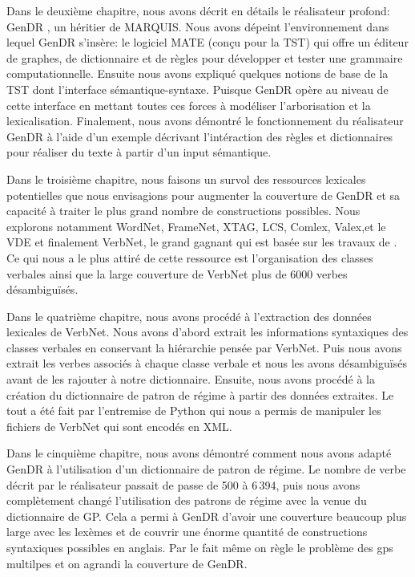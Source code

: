 Dans le deuxième chapitre, nous avons décrit en détails le réalisateur profond: GenDR \citep{lareau18}, un héritier de MARQUIS. Nous avons dépeint l'environnement dans lequel GenDR s'insère: le logiciel MATE (conçu pour la TST) qui offre un éditeur de graphes, de dictionnaire et de règles pour développer et tester une grammaire computationnelle. Ensuite nous avons expliqué quelques notions de base de la \ac{TST} dont l'interface sémantique-syntaxe. Puisque GenDR opère au niveau de cette interface en mettant toutes ces forces à modéliser l'arborisation et la lexicalisation. Finalement, nous avons démontré le fonctionnement du réalisateur GenDR à l'aide d'un exemple décrivant l'intéraction des règles et dictionnaires pour réaliser du texte à partir d'un input sémantique.

Dans le troisième chapitre, nous faisons un survol des ressources lexicales potentielles que nous envisagions pour augmenter la couverture de GenDR et sa capacité à traiter le plus grand nombre de constructions possibles. Nous explorons notamment WordNet, FrameNet, XTAG, LCS, Comlex, Valex,et le VDE et finalement VerbNet, le grand gagnant qui est basée sur les travaux de \cite{verb-classes.levin.1993}. Ce qui nous a le plus attiré de cette ressource est l'organisation des classes verbales ainsi que la large couverture de VerbNet plus de 6000 verbes désambiguïsés.

Dans le quatrième chapitre, nous avons procédé à l'extraction des données lexicales de VerbNet. Nous avons d'abord extrait les informations syntaxiques des classes verbales en conservant la hiérarchie pensée par VerbNet. Puis nous avons extrait les verbes associés à chaque classe verbale et nous les avons désambiguïsés avant de les rajouter à notre dictionnaire. Ensuite, nous avons procédé à la création du dictionnaire de patron de régime à partir des données extraites. Le tout a été fait par l'entremise de Python qui nous a permis de manipuler les fichiers de VerbNet qui sont encodés en XML.

Dans le cinquième chapitre, nous avons démontré comment nous avons adapté GenDR à l'utilisation d'un dictionnaire de patron de régime. Le nombre de verbe décrit par le réalisateur passait de passe de 500 à 6\,394, puis nous avons complètement changé l'utilisation des patrons de régime avec la venue du dictionnaire de \ac{GP}. Cela a permi à GenDR d'avoir une couverture beaucoup plus large avec les lexèmes et de couvrir une énorme quantité de constructions syntaxiques possibles en anglais. Par le fait même on règle le problème des gps multilpes et on agrandi la couverture de GenDR. 
	
